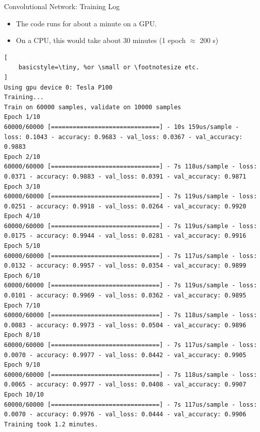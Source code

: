 \documentclass[10pt, aspectratio=169]{beamer} %
\begin{document}
\begin{frame}[fragile]{Convolutional Network: Training Log}
\begin{itemize}
	\item The code runs for about a minute on a GPU.
	\item On a CPU, this would take about 30 minutes (1 epoch $\approx$ 200 s)
\end{itemize}
\begin{lstlisting}[
    basicstyle=\tiny, %or \small or \footnotesize etc.
]
Using gpu device 0: Tesla P100
Training...
Train on 60000 samples, validate on 10000 samples
Epoch 1/10
60000/60000 [==============================] - 10s 159us/sample - loss: 0.1043 - accuracy: 0.9683 - val_loss: 0.0367 - val_accuracy: 0.9883
Epoch 2/10
60000/60000 [==============================] - 7s 118us/sample - loss: 0.0371 - accuracy: 0.9883 - val_loss: 0.0391 - val_accuracy: 0.9871
Epoch 3/10
60000/60000 [==============================] - 7s 119us/sample - loss: 0.0251 - accuracy: 0.9918 - val_loss: 0.0264 - val_accuracy: 0.9920
Epoch 4/10
60000/60000 [==============================] - 7s 119us/sample - loss: 0.0175 - accuracy: 0.9944 - val_loss: 0.0281 - val_accuracy: 0.9916
Epoch 5/10
60000/60000 [==============================] - 7s 117us/sample - loss: 0.0132 - accuracy: 0.9957 - val_loss: 0.0354 - val_accuracy: 0.9899
Epoch 6/10
60000/60000 [==============================] - 7s 119us/sample - loss: 0.0101 - accuracy: 0.9969 - val_loss: 0.0362 - val_accuracy: 0.9895
Epoch 7/10
60000/60000 [==============================] - 7s 118us/sample - loss: 0.0083 - accuracy: 0.9973 - val_loss: 0.0504 - val_accuracy: 0.9896
Epoch 8/10
60000/60000 [==============================] - 7s 117us/sample - loss: 0.0070 - accuracy: 0.9977 - val_loss: 0.0442 - val_accuracy: 0.9905
Epoch 9/10
60000/60000 [==============================] - 7s 118us/sample - loss: 0.0065 - accuracy: 0.9977 - val_loss: 0.0408 - val_accuracy: 0.9907
Epoch 10/10
60000/60000 [==============================] - 7s 117us/sample - loss: 0.0070 - accuracy: 0.9976 - val_loss: 0.0444 - val_accuracy: 0.9906
Training took 1.2 minutes.
\end{lstlisting}
\end{frame}
\end{document}
